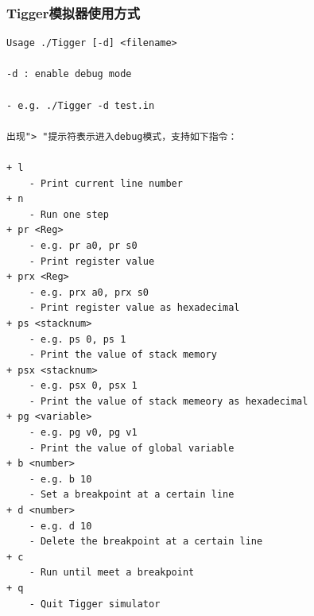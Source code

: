 \newpage
\subsubsection{Tigger模拟器使用方式}
\begin{typewriterfont}
\begin{lstlisting}
Usage ./Tigger [-d] <filename>

-d : enable debug mode

- e.g. ./Tigger -d test.in

出现"> "提示符表示进入debug模式，支持如下指令：

+ l
    - Print current line number
+ n
    - Run one step
+ pr <Reg>
    - e.g. pr a0, pr s0
    - Print register value
+ prx <Reg>
    - e.g. prx a0, prx s0
    - Print register value as hexadecimal
+ ps <stacknum>
    - e.g. ps 0, ps 1
    - Print the value of stack memory
+ psx <stacknum>
    - e.g. psx 0, psx 1
    - Print the value of stack memeory as hexadecimal
+ pg <variable>
    - e.g. pg v0, pg v1
    - Print the value of global variable
+ b <number>
    - e.g. b 10
    - Set a breakpoint at a certain line
+ d <number>
    - e.g. d 10
    - Delete the breakpoint at a certain line
+ c
    - Run until meet a breakpoint
+ q
    - Quit Tigger simulator
\end{lstlisting}
\end{typewriterfont}
